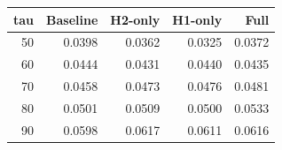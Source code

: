 \begin{tabular}{rrrrr}
\toprule
tau & Baseline & H2-only & H1-only & Full \\
\midrule
50 & 0.0398 & 0.0362 & 0.0325 & 0.0372 \\
60 & 0.0444 & 0.0431 & 0.0440 & 0.0435 \\
70 & 0.0458 & 0.0473 & 0.0476 & 0.0481 \\
80 & 0.0501 & 0.0509 & 0.0500 & 0.0533 \\
90 & 0.0598 & 0.0617 & 0.0611 & 0.0616 \\
\bottomrule
\end{tabular}
